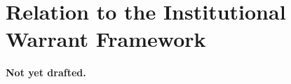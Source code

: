 \section{Relation to the Institutional Warrant Framework}
\label{sec:relation}


\textbf{Not yet drafted.}

